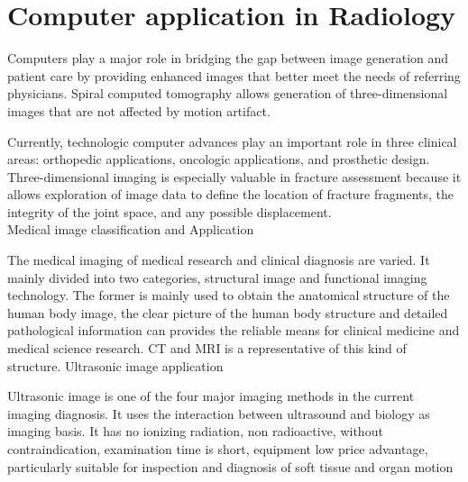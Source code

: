 \documentclass[11pt,a4paper,twoside]{article}
\begin{document}
\part{Computer application in Radiology}
Computers play a major role in bridging the gap between image generation and patient care by providing enhanced images that better meet the needs of referring physicians. Spiral computed tomography allows generation of three-dimensional images that are not affected by motion artifact.\par
Currently, technologic computer advances play an important role in three clinical areas: orthopedic applications, oncologic applications, and prosthetic design. Three-dimensional imaging is especially valuable in fracture assessment because it allows exploration of image data to define the location of fracture fragments, the integrity of the joint space, and any possible displacement.\\
Medical image classification and Application\par
The medical imaging of medical research and clinical diagnosis are varied. It mainly divided into two categories, structural image and functional imaging technology. The former is mainly used to obtain the anatomical structure of the human body image, the clear picture of the human body structure and detailed pathological information can provides the reliable means for clinical medicine and medical science research. CT and MRI is a representative of this kind of structure.
Ultrasonic image application\par
Ultrasonic image is one of the four major imaging methods in the current imaging diagnosis. It uses the interaction between ultrasound and biology as imaging basis. It has no ionizing radiation, non radioactive, without contraindication, examination time is short, equipment low price advantage, particularly suitable for inspection and diagnosis of soft tissue and organ motion
\end{document}
